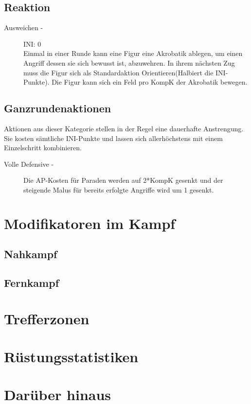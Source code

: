 \documentclass[a4paper,12pt,oneside]{book}
\begin{document}
\section{Reaktion}
\begin{description}
\item[Ausweichen -] INI: 0
\\Einmal in einer Runde kann eine Figur eine Akrobatik ablegen, um einen Angriff dessen sie sich bewusst ist, abzuwehren. In ihrem nächsten Zug muss die Figur sich als Standardaktion Orientieren(Halbiert die INI-Punkte). Die Figur kann sich ein Feld pro KompK der Akrobatik bewegen.
\end{description}

\section{Ganzrundenaktionen}
Aktionen aus dieser Kategorie stellen in der Regel eine dauerhafte Anstrengung. Sie kosten sämtliche INI-Punkte und lassen sich allerhöchstens mit einem Einzelschritt kombinieren.
\begin{description}
\item[Volle Defensive -] Die AP-Kosten für Paraden werden auf 2*KompK gesenkt und der steigende Malus für bereits erfolgte Angriffe wird um 1 gesenkt.
\end{description}


\chapter{Modifikatoren im Kampf}

\section{Nahkampf}

\section{Fernkampf}

\chapter{Trefferzonen}

\chapter{Rüstungsstatistiken}

\chapter{Darüber hinaus}
\end{document}
